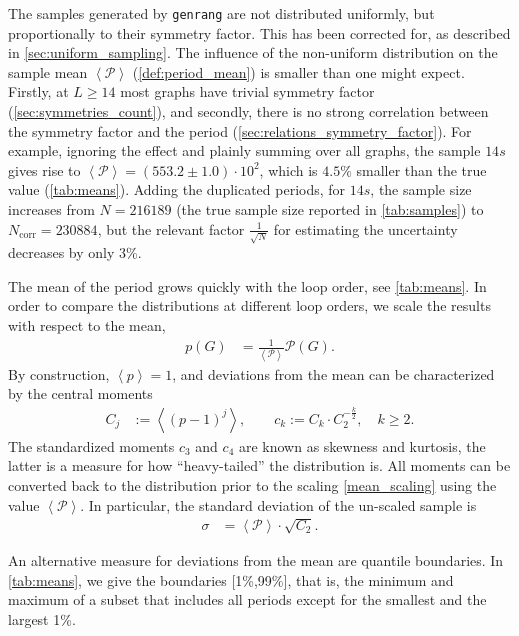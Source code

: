 \documentclass[11pt,a4paper]{article}
\newcommand{\period}{\mathcal P}
\renewcommand{\|}{\rule[-0.4ex]{0.2ex}{1.2em}}
\begin{document}
The samples generated by \texttt{genrang} are not distributed uniformly, but proportionally to their symmetry factor. This has been corrected for, as described in  \cref{sec:uniform_sampling}.
The influence of the non-uniform distribution on the sample mean $\left \langle \period \right \rangle $ (\cref{def:period_mean}) is smaller than  one might expect. Firstly,  at $L \geq 14$  most graphs have trivial symmetry factor (\cref{sec:symmetries_count}), and secondly, there is no strong correlation between the symmetry factor and the period (\cref{sec:relations_symmetry_factor}). For example, ignoring the effect and plainly summing over all graphs, the sample $14s$ gives rise to $\left \langle \period \right \rangle = (553.2 \pm 1.0) \cdot 10^2$, which is $4.5\%$ smaller than the true value (\cref{tab:means}).  Adding the duplicated periods, for $14s$, the sample size increases from $N=216189$ (the true sample size reported in \cref{tab:samples}) to $N_\text{corr}=230884$, but the relevant factor $\frac{1}{\sqrt{N}}$ for estimating the uncertainty decreases  by only 3\%. 





The mean of the period grows quickly with the loop order, see \cref{tab:means}. In order to compare the distributions at different loop orders, we scale the results with respect to the mean,
\begin{align}\label{mean_scaling}
p(G)   &= \frac{1}{\left \langle \period\right \rangle }\period(G).
\end{align}
By construction, $\left \langle p \right \rangle =1$, and deviations from the mean can be characterized by the central moments
\begin{align}\label{def:central_moments}
	C_j  &:= \left \langle (p-1)^j \right \rangle , \qquad c_k :=  C_k\cdot C_2^{-\frac k 2}, \quad k\geq 2.
\end{align}
The standardized moments $c_3$ and $c_4$ are known as skewness and kurtosis, the latter is a measure for how \enquote{heavy-tailed} the distribution is. All moments can be converted back to the distribution prior to the scaling \cref{mean_scaling} using the value $\left \langle \period \right \rangle $. In particular, the  standard deviation of the un-scaled sample is  
\begin{align}\label{C2_std}
	\sigma &= \left \langle   \period  \right \rangle   \cdot\sqrt{ C_2}.
\end{align}


An alternative measure for deviations from the mean are quantile boundaries. In \cref{tab:means}, we give the boundaries [1\%,99\%], that is, the minimum and maximum of a subset that includes all periods except for the smallest and the largest 1\%. 
\end{document}
